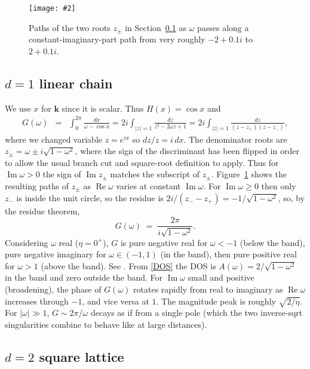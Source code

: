\documentclass[11pt]{article}
\newcommand{\bea}{\begin{eqnarray}}
\newcommand{\eea}{\end{eqnarray}}
\newcommand{\bfi}{\begin{figure}}
\newcommand{\efi}{\end{figure}}
\newcommand{\ca}[2]{\caption{#1 \label{#2}}}
\newcommand{\ig}[2]{\texttt{[image: \#2]}}
\newcommand{\mbf}[1]{{\mathbf #1}}
\DeclareMathOperator{\re}{Re}
\DeclareMathOperator{\im}{Im}
\newcommand{\om}{\omega}
\newcommand{\kk}{\mbf{k}}
\begin{document}
\bfi %
\centering
\ig{width=3.5in}{zpaths}    %
\ca{Paths of the two roots $z_\pm$ in Section~\ref{s:1d} as
  $\om$ passes along a constant-imaginary-part
  path from very roughly $-2+0.1i$ to $2+0.1i$.}{f:zpaths}
\efi

\subsection{$d=1$ linear chain}
\label{s:1d}

We use $x$ for $\kk$ since it is scalar. Thus $H(x) = \cos x$ and
\bea
G(\om) &=& \int_0^{2\pi} \frac{dx}{\om - \cos x}
= 2i \int_{|z|=1} \frac{dz}{z^2-2\om z + 1}
= 2i \int_{|z|=1} \frac{dz}{(z-z_+)(z-z_-)},
\nonumber
\eea
where we changed variable $z = e^{ix}$ so $dz/z = i\,dx$.
The denominator roots are $z_\pm = \om\pm i\sqrt{1-\om^2}$, where
the sign of the discriminant has been flipped in order to allow
the usual branch cut and square-root definition to apply.
Thus for $\im \om > 0$ the sign of $\im z_\pm$
matches the subscript of $z_\pm$.
Figure~\ref{f:zpaths} shows the resulting paths of $z_\pm$ as $\re \om$
varies at constant $\im \om$.
For $\im \om \ge 0$ then only $z_-$ is inside the unit circle, so
the residue is $2i/(z_--z_+) = -1/\sqrt{1-\om^2}$, so, by
the residue theorem,
\[
G(\om) \;=\; \frac{2\pi}{i \sqrt{1-\om^2}}.
\]
Considering $\om$ real ($\eta=0^+$),
$G$ is pure negative real for $\om<-1$ (below the band),
pure negative imaginary for $\om \in (-1,1)$ (in the band),
then pure positive real for $\om>1$ (above the band).
See \cite[Fig.~5.6]{economou}.
From \eqref{DOS} the DOS is $A(\om) = 2/\sqrt{1-\om^2}$ in the band and zero
outside the band.
For $\im \om$ small and positive (broadening),
the phase of $G(\om)$ rotates rapidly from real to imaginary as
$\re\om$ increases through $-1$, and vice versa at $1$.
The magnitude peak is roughly $\sqrt{2/\eta}$.
For $|\om|\gg 1$, $G \sim 2\pi/\om$ decays as if from
a single pole (which the two inverse-sqrt singularities combine to
behave like at large distances).


\subsection{$d=2$ square lattice}
\label{s:2d}







\end{document}
